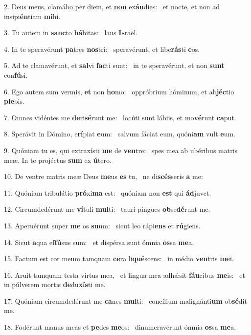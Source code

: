 2. Deus meus, clamábo per diem, et \textbf{non} ex\textbf{áu}dies: \ast\  et nocte, et non ad insipi\textbf{én}tiam \textbf{mi}hi.\

3. Tu autem in \textbf{sanc}to \textbf{há}bitas: \ast\  laus \textbf{Is}raël.\

4. In te speravérunt \textbf{pa}tres \textbf{nos}tri: \ast\  speravérunt, et libe\textbf{rás}ti \textbf{e}os.\

5. Ad te clamavérunt, et \textbf{sal}vi \textbf{fac}ti sunt: \ast\  in te speravérunt, et non \textbf{sunt} con\textbf{fú}si.\

6. Ego autem sum vermis, \textbf{et} non \textbf{ho}mo: \ast\  oppróbrium hóminum, et ab\textbf{jéc}tio \textbf{ple}bis.\

7. Omnes vidéntes me \textbf{de}ri\textbf{sé}runt me: \ast\  locúti sunt lábiis, et mo\textbf{vé}runt \textbf{ca}put.\

8. Sperávit in Dómino, e\textbf{rí}piat \textbf{e}um: \ast\  salvum fáciat eum, quóni\textbf{am} vult \textbf{e}um.\

9. Quóniam tu es, qui extraxísti \textbf{me} de \textbf{ven}tre: \ast\  spes mea ab ubéribus matris meæ. In te projéctus \textbf{sum} ex \textbf{ú}tero.\

10. De ventre matris meæ Deus \textbf{me}us \textbf{es} tu, \ast\  ne di\textbf{scés}seris \textbf{a} me:\

11. Quóniam tribulátio \textbf{pró}xi\textbf{ma} est: \ast\  quóniam non \textbf{est} qui \textbf{ád}juvet.\

12. Circumdedérunt me \textbf{ví}tuli \textbf{mul}ti: \ast\  tauri pingues \textbf{ob}se\textbf{dé}runt me.\

13. Aperuérunt super \textbf{me} os \textbf{su}um: \ast\  sicut leo rápi\textbf{ens} et \textbf{rú}giens.\

14. Sicut \textbf{a}qua ef\textbf{fú}sus sum: \ast\  et dispérsa sunt ómnia \textbf{os}sa \textbf{me}a.\

15. Factum est cor meum tamquam \textbf{ce}ra li\textbf{qué}scens: \ast\  in médio \textbf{ven}tris \textbf{me}i.\

16. Aruit tamquam testa virtus mea, \dag\  et lingua mea adhǽsit \textbf{fáu}cibus \textbf{me}is: \ast\  et in púlverem mortis \textbf{de}du\textbf{xís}ti me.\

17. Quóniam circumdedérunt me \textbf{ca}nes \textbf{mul}ti: \ast\  concílium malignánti\textbf{um} ob\textbf{sé}dit me.\

18. Fodérunt manus meas et \textbf{pe}des \textbf{me}os: \ast\  dinumeravérunt ómnia \textbf{os}sa \textbf{me}a.\

